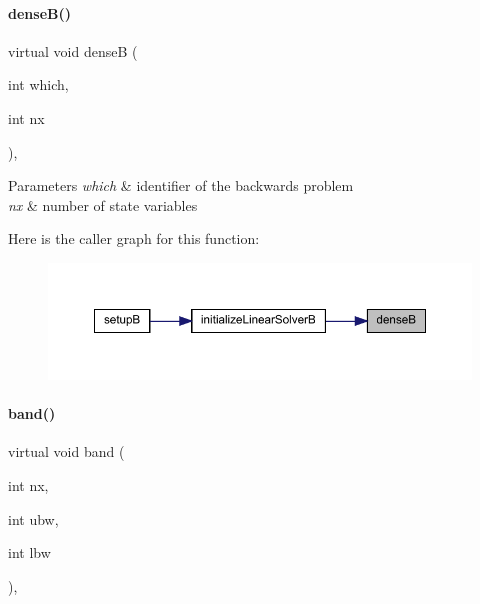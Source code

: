 \paragraph{\texorpdfstring{denseB()}{denseB()}}
{\footnotesize\ttfamily virtual void denseB (\begin{DoxyParamCaption}\item[{int}]{which,  }\item[{int}]{nx }\end{DoxyParamCaption})\hspace{0.3cm}{\ttfamily [protected]}, {}}


\begin{DoxyParams}{Parameters}
{\em which} & identifier of the backwards problem \\
\hline
{\em nx} & number of state variables \\
\hline
\end{DoxyParams}
Here is the caller graph for this function\+:
\nopagebreak
\begin{figure}[H]
\begin{center}
\leavevmode
\includegraphics[width=350pt]{classamici_1_1_solver_aaa1ecd357b3facae2f2d12784563ad25_icgraph}
\end{center}
\end{figure}
\mbox{\label{classamici_1_1_solver_a00863fd76b453dae4e883a6dd5512df3}} 
\paragraph{\texorpdfstring{band()}{band()}}
{\footnotesize\ttfamily virtual void band (\begin{DoxyParamCaption}\item[{int}]{nx,  }\item[{int}]{ubw,  }\item[{int}]{lbw }\end{DoxyParamCaption})\hspace{0.3cm}{\ttfamily [protected]}, {}}


